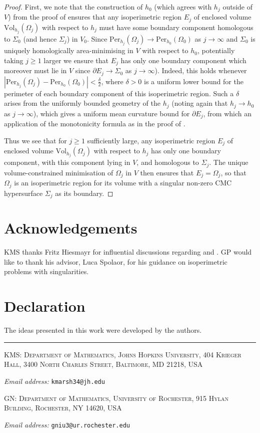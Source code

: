 \documentclass[12pt]{article}
\makeatletter
\newcommand{\Addresses}{{
  \bigskip
  \footnotesize

KMS:
\textsc{Department of Mathematics, Johns Hopkins University, 404 Krieger Hall, 3400 North Charles Street, Baltimore, MD 21218, USA}\par\nopagebreak
  \textit{Email address:} \texttt{kmarsh34@jh.edu}

\medskip

GN:
\textsc{Department of Mathematics, University of Rochester, 915 Hylan Building, Rochester, NY 14620, USA}\par\nopagebreak
  \textit{Email address:} \texttt{gniu3@ur.rochester.edu}

}}
\makeatother
\begin{document}
\begin{proof}
\bigskip

First, we note that the construction of $h_0$ (which agrees with $h_j$ outside of $V$) from the proof of \cite[Theorem 1]{MN26} ensures that any isoperimetric region $E_j$ of enclosed volume $\mathrm{Vol}_{h_j}(\Omega_j)$ with respect to $h_j$ must have some boundary component homologous to $\Sigma_0$ (and hence $\Sigma_j$) in $V_0$. Since $\mathrm{Per}_{h_j}(\Omega_j) \rightarrow \mathrm{Per}_{h_0}(\Omega_0)$ as $j \rightarrow \infty$ and $\Sigma_0$ is uniquely homologically area-minimising in $V$ with respect to $h_0$, potentially taking $j \geq 1$ larger we ensure that $E_j$ has only one boundary component which moreover must lie in $V$ since $\partial E_j \rightarrow \Sigma_0$ as $j \rightarrow \infty$). Indeed, this holds whenever 
$|\mathrm{Per}_{h_j}(\Omega_j) - \mathrm{Per}_{h_0}(\Omega_0)| < \frac{\delta}{2}$,
where $\delta > 0$ is a uniform lower bound for the perimeter of each boundary component of this isoperimetric region. Such a $\delta$ arises from the uniformly bounded geometry of the $h_j$ (noting again that $h_j \rightarrow h_0$ as $j \rightarrow \infty$), which gives a uniform mean curvature bound for $\partial E_j$, from which an application of the monotonicity formula as in the proof of \cite[Theorem 1]{MN26}. 

\bigskip

Thus we see that for $j \geq 1$ sufficiently large, any isoperimetric region $E_j$ of enclosed volume $\mathrm{Vol}_{h_j}(\Omega_j)$ with respect to $h_j$ has only one boundary component, with this component lying in $V$, and homologous to $\Sigma_j$. The unique volume-constrained minimisation of $\Omega_j$ in $V$ then ensures that $E_j = \Omega_j$, so that $\Omega_j$ is an isoperimetric region for its volume with a singular non-zero CMC hypersurface $\Sigma_j$ as its boundary.
\end{proof}


\section*{Acknowledgements} KMS thanks Fritz Hiesmayr for influential discussions regarding \cite{CHS84} and \cite{I17}. GP would like to thank his advisor, Luca Spolaor, for his guidance on isoperimetric problems with singularities.


\section*{Declaration} The ideas presented in this work were developed by the authors.





\hrule
\Addresses
\end{document}
